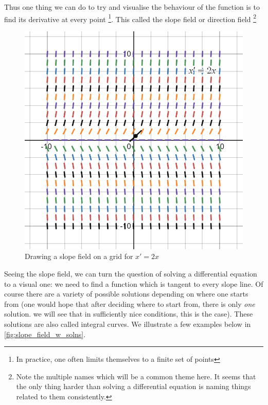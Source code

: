 Thus one thing we can do to try and visualise the behaviour of the function is to find its derivative at every point \footnote{In practice, one often limits themselves to a finite set of points}. This called the slope field or direction field \footnote{Note the multiple names which will be a common theme here. It seems that the only thing harder than solving a differential equation is naming things related to them consistently.}
\begin{figure}[h]
    \centering
    \includegraphics[scale=0.3]{Images/slope_field_2.png}
    \caption{Drawing a slope field on a grid for $x' = 2x$}
    \label{fig:slope_field}
\end{figure}

Seeing the slope field, we can turn the question of solving a differential equation to a visual one: we need to find a function which is tangent to every slope line. Of course there are a variety of possible solutions depending on where one starts from (one would hope that after deciding where to start from, there is only \textit{one} solution. we will see that in sufficiently nice conditions, this is the case). These solutions are also called integral curves. We illustrate a few examples below in \autoref{fig:slope_field_w_solns}. 

